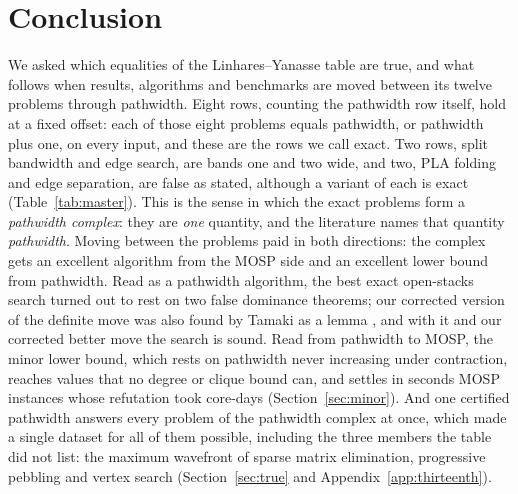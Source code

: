 \section{Conclusion}
\label{sec:closing}

We asked which equalities of the Linhares--Yanasse table are true, and what
follows when results, algorithms and benchmarks are moved between its twelve
problems through pathwidth. Eight rows, counting the pathwidth row itself, hold at a fixed offset: each
of those eight problems equals pathwidth, or pathwidth plus one, on every
input, and these are the rows we call exact. Two rows, split bandwidth and edge search, are bands
one and two wide, and two, PLA folding and edge separation, are false as stated,
although a variant of each is exact (Table~\ref{tab:master}). This is the sense in which the exact problems form a \emph{pathwidth
complex}: they are \emph{one} quantity, and the literature names that quantity
\emph{pathwidth}. Moving between the problems paid in both directions: the
complex gets an excellent algorithm from the MOSP side and an excellent lower
bound from pathwidth. Read as a pathwidth algorithm, the best exact
open-stacks search turned out to rest on two false dominance theorems; our
corrected version of the definite move was also found by Tamaki as a lemma \citep[Lemma~1]{Kitsunai2016}, and with it and our corrected better
move the search is sound. Read from pathwidth to MOSP, the minor lower bound, which rests on
pathwidth never increasing under contraction, reaches values that no degree or
clique bound can, and settles in seconds MOSP instances whose refutation took
core-days (Section~\ref{sec:minor}). And one certified pathwidth answers every problem of the pathwidth complex at
once, which made a single dataset for all of them possible, including the three
members the table did not list: the maximum wavefront of sparse matrix
elimination, progressive pebbling and vertex search
(Section~\ref{sec:true} and Appendix~\ref{app:thirteenth}).

